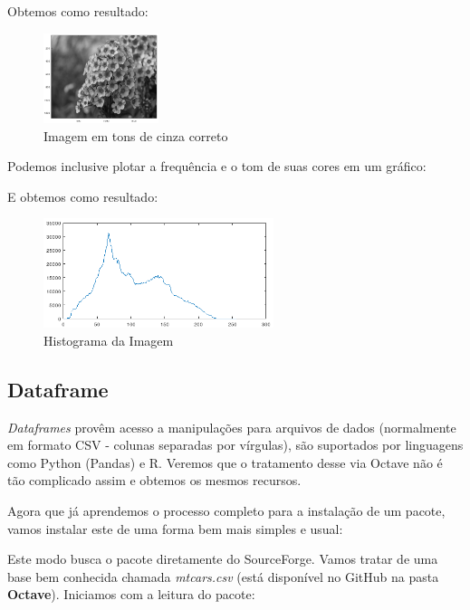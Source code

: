 \documentclass[a4paper,11pt]{article}
\begin{document}
Obtemos como resultado:
\begin{figure}[H]
	\centering
	\includegraphics[width=0.3\textwidth]{imagem/azaleiag2}
	\caption{Imagem em tons de cinza correto}
\end{figure}

Podemos inclusive plotar a frequência e o tom de suas cores em um gráfico: \\

E obtemos como resultado:
\begin{figure}[H]
	\centering
	\includegraphics[width=0.6\textwidth]{imagem/azaleiHist}
	\caption{Histograma da Imagem}
\end{figure}

\subsection{Dataframe}
\textit{Dataframes} provêm acesso a manipulações para arquivos de dados (normalmente em formato CSV - colunas separadas por vírgulas), são suportados por linguagens como Python (Pandas) e R. Veremos que o tratamento desse via Octave não é tão complicado assim e obtemos os mesmos recursos.

Agora que já aprendemos o processo completo para a instalação de um pacote, vamos instalar este de uma forma bem mais simples e usual: \\

Este modo busca o pacote diretamente do SourceForge. Vamos tratar de uma base bem conhecida chamada \textit{mtcars.csv} (está disponível no GitHub \cite{github} na pasta \textbf{Octave}). Iniciamos com a leitura do pacote: \\
\end{document}
